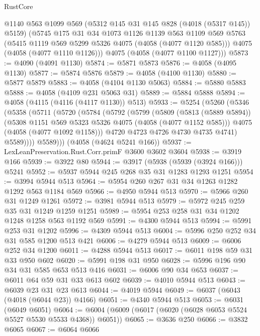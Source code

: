 \begin{lexlean}{RustCore}
\begin{coremodule}
      @1140
      @563
      @1099
      @569
      (@5312 @145 @31 @145 @828 (@4018 (@5317 @145)) @5159)
      (@5745
        @175
        @31
        @34
        @1073
        @1126
        @1139
        @563
        @1109
        @569
        @5763
        (@5415 @1119 @569 @5299 @5326 @4075 (@4058 (@4077 @1120 @585)))
        @4075
        (@4058 (@4077 @1110 @1126)))
      @4075
      (@4058 (@4077 @1100 @1127)))
@5873 := @4090 (@4091 @1130)
@5874 := @5871 @5873
@5876 := @4058 (@4095 @1130)
@5877 := @5874 @5876
@5879 := @4058 (@4100 @1130)
@5880 := @5877 @5879
@5883 := @4058 (@4104 @1130 @5063)
@5884 := @5880 @5883
@5888 := @4058 (@4109 @231 @5063 @31)
@5889 := @5884 @5888
@5894 := @4058 (@4115 (@4116 (@4117 @1130)) @513)
@5933 := @5254
    (@5260
      (@5346
        (@5358
          (@5711
            (@5720
              (@5784
                (@5792
                  (@5799
                    (@5809
                      (@5813 (@5889 @5894))
                      (@5308 @1151 @569 @5323 @5326 @4075 (@4058 (@4077 @1152 @585)))
                      @4075
                      (@4058 (@4077 @1092 @1158)))
                    @4720
                    @4723
                    @4726
                    @4730
                    @4735
                    @4741)
                  @5589))))
          @5589)))
    (@4058 (@4624 @5241 @166))
@5937 := LexLeanPreservation.Rust.Corr.primF @3600 @3602 @3604
@5938 := @3919 @166
@5939 := @3922 @80
@5944 := @3917 (@5938 (@5939 (@3924 @166))) @5241
@5952 := @5937 @5944 @245 @268 @35 @31 @1283 @1293 @1251
@5954 := @3994 @5944 @513
@5964 := @5954 @260 @267 @31 @34 @1263 @1282 @1292 @563 @1184 @569
@5966 := @4950 @5944 @513
@5970 := @5966 @260 @31 @1249 @1261
@5972 := @3981 @5944 @513
@5979 := @5972 @245 @259 @35 @31 @1249 @1259 @1251
@5989 := @5954 @253 @258 @31 @34 @1202 @1248 @1258 @563 @1192 @569
@5991 := @4300 @5944 @513
@5994 := @5991 @253 @31 @1202
@5996 := @4309 @5944 @513
@6004 := @5996 @250 @252 @34 @31 @585 @1200 @513 @421
@6006 := @4279 @5944 @513
@6009 := @6006 @252 @34 @1200
@6011 := @4288 @5944 @513
@6017 := @6011 @198 @59 @31 @33 @950 @602
@6020 := @5991 @198 @31 @950
@6028 := @5996 @196 @90 @34 @31 @585 @653 @513 @416
@6031 := @6006 @90 @34 @653
@6037 := @6011 @64 @59 @31 @33 @613 @602
@6039 := @4010 @5944 @513
@6043 := @6039 @23 @31 @23 @613
@6044 := @4019 @5944
@6049 := @6037 (@6043 (@4018 (@6044 @23)) @4166)
@6051 := @4340 @5944 @513
@6053 := @6031 (@6049 @6051)
@6064 := @6004 (@6009 (@6017 (@6020 (@6028 @6053 @5524 @5527 @5530 @5533 @4368)) @6051))
@6065 := @3636 @250
@6066 := @3832 @6065
@6067 := @6064 @6066

\end{coremodule}
\end{lexlean}

